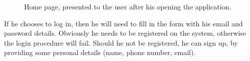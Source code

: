 \begin{figure}%
	\hfill%
	\hfill%
	\caption{Home page, presented to the user after his opening the application.}\label{fig:firstPage}
\end{figure}

\clearpage 

If he chooses to log in, then he will need to fill in the form with his email and password details. Obviously he needs to be registered on the system, otherwise the login procedure will fail. Should he not be registered, he can sign up, by providing some personal details (name, phone number, email).

